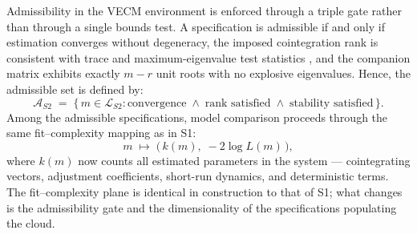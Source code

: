 \documentclass[11pt,a4paper]{article}
\begin{document}

Admissibility in the VECM environment is enforced through a triple gate
rather than through a single bounds test. A specification is admissible if
and only if estimation converges without degeneracy, the imposed cointegration
rank is consistent with trace and maximum-eigenvalue test statistics
\citep{Johansen1991}, and the companion matrix exhibits exactly $m - r$ unit roots with no explosive eigenvalues. Hence, the admissible set is defined by: 
%
\begin{equation}
	\label{eq:S2_admissible}
	\mathcal{A}_{S2} \;=\;
	\bigl\{\, m \in \mathcal{L}_{S2} :
	\text{convergence} \;\wedge\;
	\text{rank satisfied} \;\wedge\;
	\text{stability satisfied}
	\,\bigr\}.
\end{equation}
%
Among the admissible specifications, model comparison proceeds through the
same fit--complexity mapping as in S1:
%
\begin{equation}
	\label{eq:S2_fitcomplexity}
	m \;\mapsto\; \bigl(\,k(m),\; -2\log L(m)\,\bigr),
\end{equation}
%
where $k(m)$ now counts all estimated parameters in the system ---
cointegrating vectors, adjustment coefficients, short-run dynamics, and
deterministic terms. The fit--complexity plane is identical in construction to
that of S1; what changes is the admissibility gate and the dimensionality of
the specifications populating the cloud.

\end{document}
